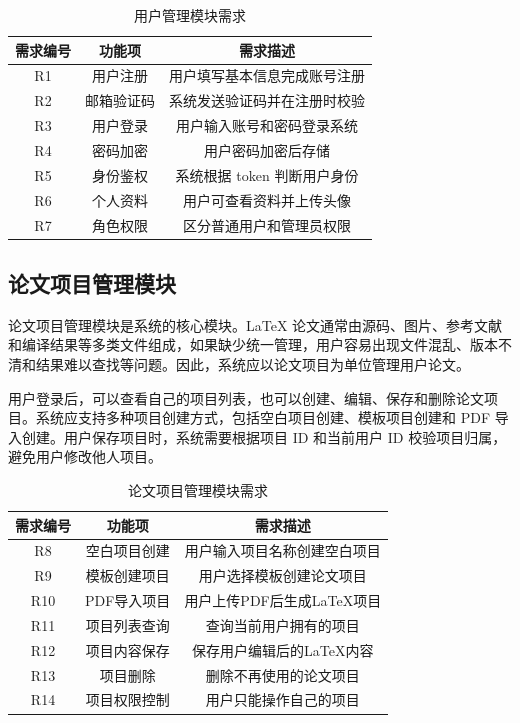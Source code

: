 \documentclass{xduugthesis}
\begin{document}
\begin{table}[!ht]
    \centering
    \caption{用户管理模块需求}
    \label{tab:user-requirement}
    \begin{tabular}{|c|c|c|}
        \hline
        需求编号 & 功能项 & 需求描述 \\
        \hline
        R1 & 用户注册 & 用户填写基本信息完成账号注册 \\
        \hline
        R2 & 邮箱验证码 & 系统发送验证码并在注册时校验 \\
        \hline
        R3 & 用户登录 & 用户输入账号和密码登录系统 \\
        \hline
        R4 & 密码加密 & 用户密码加密后存储 \\
        \hline
        R5 & 身份鉴权 & 系统根据 token 判断用户身份 \\
        \hline
        R6 & 个人资料 & 用户可查看资料并上传头像 \\
        \hline
        R7 & 角色权限 & 区分普通用户和管理员权限 \\
        \hline
    \end{tabular}
\end{table}

\subsection{论文项目管理模块}
论文项目管理模块是系统的核心模块。LaTeX 论文通常由源码、图片、参考文献和编译结果等多类文件组成，如果缺少统一管理，用户容易出现文件混乱、版本不清和结果难以查找等问题。因此，系统应以论文项目为单位管理用户论文。

用户登录后，可以查看自己的项目列表，也可以创建、编辑、保存和删除论文项目。系统应支持多种项目创建方式，包括空白项目创建、模板项目创建和 PDF 导入创建。用户保存项目时，系统需要根据项目 ID 和当前用户 ID 校验项目归属，避免用户修改他人项目。

\begin{table}[!ht]
    \centering
    \caption{论文项目管理模块需求}
    \label{tab:project-requirement}
    \begin{tabular}{|c|c|c|}
        \hline
        需求编号 & 功能项 & 需求描述 \\
        \hline
        R8 & 空白项目创建 & 用户输入项目名称创建空白项目 \\
        \hline
        R9 & 模板创建项目 & 用户选择模板创建论文项目 \\
        \hline
        R10 & PDF导入项目 & 用户上传PDF后生成LaTeX项目 \\
        \hline
        R11 & 项目列表查询 & 查询当前用户拥有的项目 \\
        \hline
        R12 & 项目内容保存 & 保存用户编辑后的LaTeX内容 \\
        \hline
        R13 & 项目删除 & 删除不再使用的论文项目 \\
        \hline
        R14 & 项目权限控制 & 用户只能操作自己的项目 \\
        \hline
    \end{tabular}
\end{table}
\end{document}

